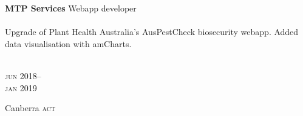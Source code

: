 
\begin{minipage}[t]{\mainboxwidth\textwidth}
\textbf{MTP Services}\phantom{..} Webapp developer\\
\\
{\small
Upgrade of Plant Health Australia's AusPestCheck biosecurity webapp. Added 
data visualisation with amCharts.}
\\
\\
{\small
\par}
\end{minipage}
\begin{minipage}[t]{\detailboxwidth\textwidth}
{
\hfill \textsc{jun} 2018--\\ 
\hspace*{0pt} \hfill \textsc{jan} 2019
\par
{\small\hfill Canberra \textsc{act}}
}
\end{minipage}

